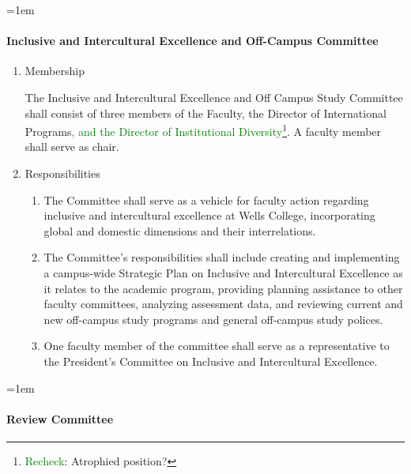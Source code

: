 \documentclass{manual}
\let\oldparagraph\paragraph
\renewcommand\paragraph{\leftskip=1em\oldparagraph}
\newcommand{\editRemark}[3]{\textcolor{green}{#2}\footnote{\textcolor{green}{#1}: #3}}
\newcommand{\itemLevelA}{\alph*.}
\newcommand{\itemLevelB}{\arabic*)}
\newcommand{\itemRefA}{\alph*}
\newcommand{\itemRefB}{\arabic*}
\begin{document}
\paragraph{Inclusive and Intercultural Excellence and Off-Campus Committee}

\begin{enumerate}[label=\itemLevelA,ref=\itemRefA]
\item Membership

The Inclusive and Intercultural Excellence and Off Campus Study Committee shall consist of three members of the Faculty, the Director of International Programs\editRemark{Recheck}{, and the Director of Institutional Diversity}{Atrophied position?}. A faculty member shall serve as chair.
\item Responsibilities
\begin{enumerate}[label=\itemLevelB,ref=\itemRefB]
\item The Committee shall serve as a vehicle for faculty action regarding inclusive and intercultural excellence at Wells College, incorporating global and domestic dimensions and their interrelations.
\item The Committee's responsibilities shall include creating and implementing a campus-wide Strategic Plan on Inclusive and Intercultural Excellence as it relates to the academic program, providing planning assistance to other faculty committees, analyzing assessment data, and reviewing current and new off-campus study programs and general off-campus study polices.
\item One faculty member of the committee shall serve as a representative to the President's Committee on Inclusive and Intercultural Excellence.

\end{enumerate}
\end{enumerate}

\paragraph{Review Committee}\label{par:ReviewCommittee}
\end{document}

